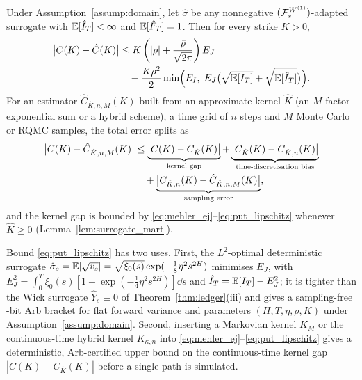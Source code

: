 \begin{theorem}
\label{thm:put_lipschitz}
Under Assumption~\ref{assump:domain}, let $\hat{\sigma}$ be any nonnegative $(\mathcal{F}_s^{W^{(1)}})$-adapted surrogate with $\mathbb{E}[\hat{I}_T]<\infty$ and $\mathbb{E}[\hat{F}_T]=1$. Then for every strike $K>0$,
\begin{equation}
  \begin{aligned}
  \bigl|C(K)-\hat{C}(K)\bigr|
  &\le K\left(|\rho| + \frac{\bar{\rho}}{\sqrt{2\pi}}\right) E_J \\
  &\quad + \frac{K\rho^2}{2}\min\Bigl(E_I,\;  E_J\bigl(\sqrt{\mathbb{E}[I_T]}+\sqrt{\mathbb{E}[\hat{I}_T]}\bigr)\Bigr).
  \end{aligned}
  \label{eq:put_lipschitz}
\end{equation}
For an estimator $\hat{C}_{\hat{K},n,M}(K)$ built from an approximate kernel $\hat{K}$ (an $M$-factor exponential sum or a hybrid scheme), a time grid of $n$ steps and $M$ Monte Carlo or RQMC samples, the total error splits as
\begin{equation}
  \begin{aligned}
    \bigl|C(K) - \hat{C}_{\hat{K},n,M}(K)\bigr|
    &\le \underbrace{\bigl|C(K)-C_{\hat{K}}(K)\bigr|}_{\text{kernel gap}}
       + \underbrace{\bigl|C_{\hat{K}}(K)-C_{\hat{K},n}(K)\bigr|}_{\text{time-discretisation bias}} \\
    &\quad + \underbrace{\bigl|C_{\hat{K},n}(K)-\hat{C}_{\hat{K},n,M}(K)\bigr|}_{\text{sampling error}},
  \end{aligned}
  \label{eq:three_way}
\end{equation}
and the kernel gap is bounded by \eqref{eq:mehler_ej}--\eqref{eq:put_lipschitz} whenever $\hat{K}\ge 0$ (Lemma~\ref{lem:surrogate_mart}).
\end{theorem}

Bound \eqref{eq:put_lipschitz} has two uses. First, the $L^2$-optimal deterministic surrogate $\hat{\sigma}_s=\mathbb{E}[\sqrt{v_s}]=\sqrt{\xi_0(s)}\exp(-\tfrac18\eta^2 s^{2H})$ minimises $E_J$, with $E_J^2=\int_0^T\xi_0(s)[1-\exp(-\tfrac14\eta^2 s^{2H})]\dd s$ and $\hat{I}_T=\mathbb{E}[I_T]-E_J^2$; it is tighter than the Wick surrogate $\hat{Y}_s\equiv 0$ of Theorem~\ref{thm:ledger}(iii) and gives a sampling-free \ArbBits-bit Arb bracket for flat forward variance and parameters $(H,T,\eta,\rho,K)$ under Assumption~\ref{assump:domain}. Second, inserting a Markovian kernel $K_M$ or the continuous-time hybrid kernel $K_{\kappa,n}$ into \eqref{eq:mehler_ej}--\eqref{eq:put_lipschitz} gives a deterministic, Arb-certified upper bound on the continuous-time kernel gap $|C(K)-C_{\hat{K}}(K)|$ before a single path is simulated.

